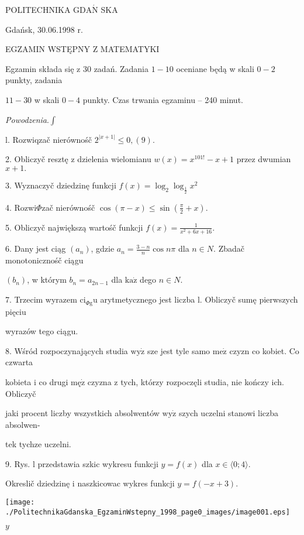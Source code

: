 \documentclass[a4paper,12pt]{article}
\begin{document}
POLITECHNIKA $\mathrm{G}\mathrm{D}\mathrm{A}\acute{\mathrm{N}}$ SKA

Gdańsk, 30.06.1998 r.

EGZAMIN WSTĘPNY Z MATEMATYKI

Egzamin składa się z 30 zadań. Zadania $1-10$ oceniane będą w skali $0-2$ punkty, zadania

$11-30$ w skali $0-4$ punkty. Czas trwania egzaminu -- 240 minut.

{\it Powodzenia}.$\displaystyle \int$

l. Rozwiqzač nierównośč $2^{|x+1|}\leq 0,(9).$

2. Obliczyč resztę z dzielenia wielomianu $w(x)=x^{101!}-x+1$ przez dwumian $x+1.$

3. Wyznaczyč dziedzinę funkcji $f(x)=\log_{2}\log_{\frac{1}{2}}x^{2}$

4. Rozwi$\Phi$zač nierównośč $\displaystyle \cos(\pi-x)\leq\sin(\frac{\pi}{2}+x).$

5. Obliczyč największą wartośč funkcji $f(x)=\displaystyle \frac{1}{x^{2}+6x+16}.$

6. Dany jest ciąg $(a_{n})$, gdzie $ a_{n}=\displaystyle \frac{3-n}{n}\cos n\pi$ dla $n\in N$. Zbadač monotonicznośč ciągu

$(b_{n})$, w którym $b_{n}=a_{2n-1}$ dla $\mathrm{k}\mathrm{a}\dot{\mathrm{z}}$ dego $n\in N.$

7. Trzecim wyrazem $\mathrm{c}\mathrm{i}_{\Phi \mathrm{g}}\mathrm{u}$ arytmetycznego jest liczba l. Obliczyč sumę pierwszych pięciu

wyrazów tego ciągu.

8. Wśród rozpoczynających studia $\mathrm{w}\mathrm{y}\dot{\mathrm{z}}$ sze jest tyle samo $\mathrm{m}\mathrm{e}\dot{\mathrm{z}}$ czyzn co kobiet. Co czwarta

kobieta i co drugi $\mathrm{m}\text{ę}\dot{\mathrm{z}}$ czyzna z tych, którzy rozpoczęli studia, nie kończy ich. Obliczyč

jaki procent liczby wszystkich absolwentów $\mathrm{w}\mathrm{y}\dot{\mathrm{z}}$ szych uczelni stanowi liczba absolwen-

tek tychze uczelni.

9. Rys. l przedstawia szkic wykresu funkcji $y=f(x)$ dla $x\in\langle 0;4\rangle.$

Okreslič dziedzinę i naszkicowac wykres funkcji $y=f(-x+3).$
\begin{center}
\texttt{[image: ./PolitechnikaGdanska\_EgzaminWstepny\_1998\_page0\_images/image001.eps]}
\end{center}
$y$
\end{document}
